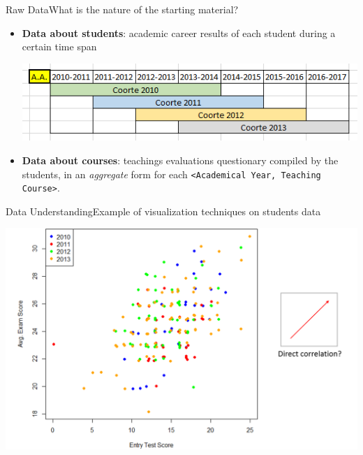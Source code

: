 \begin{frame}{Raw Data}{What is the nature of the starting material?}

\begin{itemize}

    \item<1->\textbf{Data about \alert{students}}: academic career results of each student during a certain time span \\
        \noindent\begin{centering}
            \includegraphics[scale=0.50]{../raw/stud_comp.png}
        \end{centering}

    \item<2->\textbf{Data about \alert{courses}}: teachings evaluations questionary compiled by the students, in an \emph{aggregate} form for each \texttt{<Academical Year, Teaching Course>}.

\end{itemize}

\end{frame}

\begin{frame}{Data Understanding}{Example of visualization techniques on students data}

    \vspace{0.2cm}
    \begin{centering}
        \includegraphics[scale=0.28]{img2_noback.png}
    \end{centering}

\end{frame}

